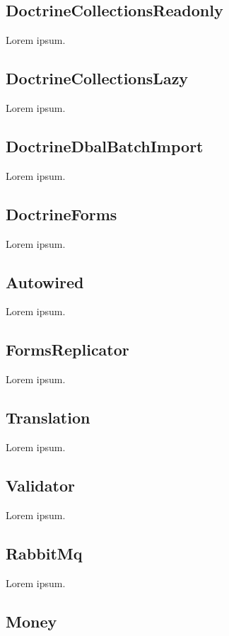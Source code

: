 \subsection{DoctrineCollectionsReadonly}

Lorem ipsum.

\subsection{DoctrineCollectionsLazy}

Lorem ipsum.

\subsection{DoctrineDbalBatchImport}

Lorem ipsum.

\subsection{DoctrineForms}

Lorem ipsum.

\subsection{Autowired}

Lorem ipsum.

\subsection{FormsReplicator}

Lorem ipsum.

\subsection{Translation}

Lorem ipsum.

\subsection{Validator}

Lorem ipsum.

\subsection{RabbitMq}

Lorem ipsum.

\subsection{Money}

